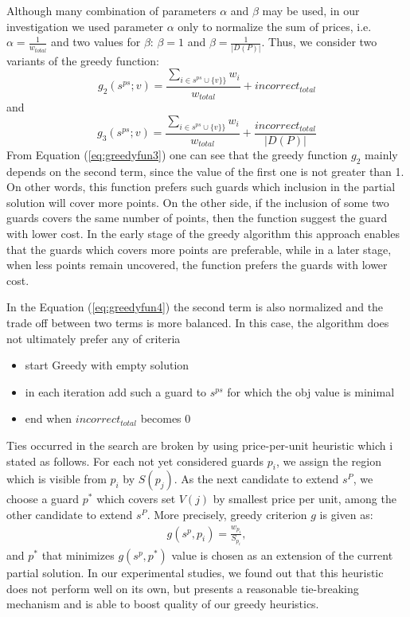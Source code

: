 \documentclass[runningheads,a4paper]{elsarticle}
\begin{document}
            Although many combination of parameters $ \alpha $ and $\beta$ may be used, in our investigation we used parameter $\alpha$  only to normalize the sum of prices, i.e. $\alpha = \frac{1}{w_{total}}$ and two values for $\beta$: $\beta = 1$ and $\beta = \frac{1}{|D(P)|}$. Thus, we consider two variants of the greedy function:
                    \begin{equation}\label{eq:greedyfun3}
				g_2(s^{ps}; v)  =  \frac{\sum_{i \in s^{ps} \cup \{v\}\}} w_i}{w_{total}}+ incorrect_{total}
		\end{equation}
and 
        \begin{equation}\label{eq:greedyfun4}
				g_3(s^{ps}; v)  =    \frac{\sum_{i \in s^{ps} \cup \{v\}\}} w_i}{w_{total}}+ \frac{incorrect_{total}}{|D(P)|}
		\end{equation}
            From Equation (\ref{eq:greedyfun3}) one can see that the greedy function $g_2$ mainly depends on the second term, since the value of the first one is not greater than 1. On other words, this function prefers such guards  which inclusion in the partial solution will cover more points. On the other side, if the inclusion of some two guards covers the same number of points, then the function suggest  the guard with lower cost. In the early stage of the greedy algorithm this approach enables that the guards which covers more points are preferable, while in a later stage, when less points remain uncovered, the function prefers the guards with lower cost.


            In the Equation  (\ref{eq:greedyfun4}) the second term is also normalized and the trade off between two terms is more balanced.
            In this case, the algorithm does not  ultimately prefer any of criteria
            \begin{itemize}

\item start Greedy with empty solution
			\item in each iteration add such a guard to $s^{ps}$ for which the obj value is minimal
			\item end when $incorrect_{total}$ becomes 0
          \end{itemize}
      Ties occurred in the search are broken by using  price-per-unit heuristic which i stated as follows.
       For each not yet considered guards $p_i$, we assign the region which is visible from $p_i$ by $S(p_j)$. As the next candidate to extend $s^P$, we choose a guard $p^*$ which covers set $V(j)$ by smallest price per unit, among the other candidate to extend $s^P$. More precisely, greedy criterion $g$ is given as:
      \begin{align}
      g(s^p, p_i) = \frac{w_{p_i}}{S_{p_i}},
      \end{align}
      and $p^*$ that minimizes $g(s^p, p^*)$ value is chosen as an extension of the current partial solution.
      In our experimental studies, we found out that this heuristic does not perform well on its own, but presents a reasonable tie-breaking mechanism and is able to boost quality of our greedy heuristics.
\end{document}
